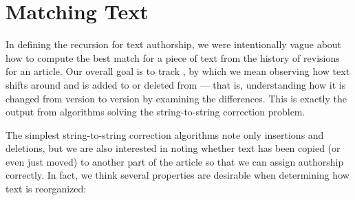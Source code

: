 \section{Matching Text}

In defining the recursion for text authorship, we were intentionally
vague about how to compute the best match for a piece of text
from the history of revisions for an article.
Our overall goal is to track ,
by which we mean observing how text shifts
around and is added to or deleted from --- that is,
understanding how it is changed from version to version
by examining the differences.
This is exactly the output from algorithms solving the
string-to-string correction problem.

The simplest string-to-string correction algorithms
note only insertions and deletions, but we are also interested
in noting whether text has been copied (or even just moved)
to another part of the article so that we can assign authorship
correctly.
In fact, we think several properties are desirable
when determining how text is reorganized:
